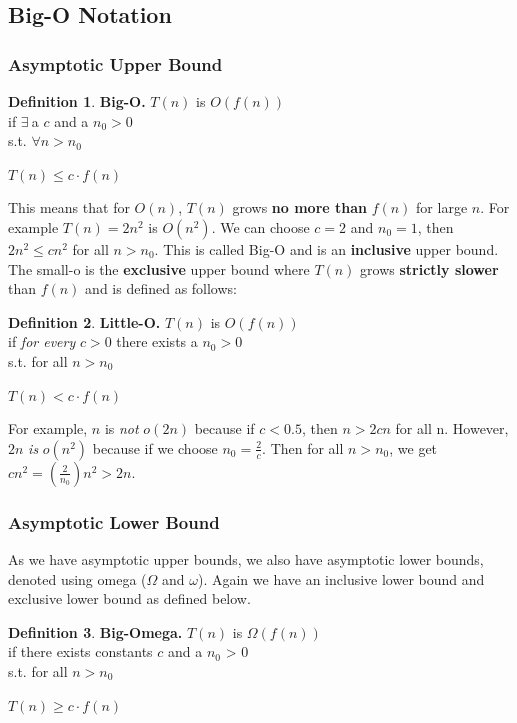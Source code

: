 \documentclass{article}
\theoremstyle{definition}
\newtheorem{definition}{Definition}[section]
\newcommand{\n}[0]{\\[\baselineskip]}
\begin{document}
\subsection{Big-O Notation}
\subsubsection{Asymptotic Upper Bound}
\begin{definition}{\textbf{Big-O.}}
$T(n)$ is $O(f(n))$ \\
if $\exists\ $a $c$ and a $n_{0} > 0$ \\
\quad s.t. $\forall n > n_{0}$
\begin{center}
$T(n) \leq c \cdot f(n)$
\end{center}
\end{definition}
\noindent
This means that for $O(n)$, $T(n)$ grows \textbf{no more than} $f(n)$ for large $n$. For example $T(n) = 2n^2$ is $O(n^2)$. We can choose $c = 2$ and $n_{0} = 1$, then $2n^2 \leq cn^2$ for all $n > n_{0}$. This is called Big-O and is an \textbf{inclusive} upper bound.
\n
The small-o is the \textbf{exclusive} upper bound where $T(n)$ grows \textbf{strictly slower} than $f(n)$ and is defined as follows:
\begin{definition}{\textbf{Little-O.}}
$T(n)$ is $O(f(n))$ \\
if \textit{for every} $c > 0$ there exists a $n_{0} > 0$ \\
s.t. for all $n > n_{0}$
\begin{center}
$T(n) < c \cdot f(n)$
\end{center}
\end{definition}
\noindent
For example, $n$ is \textit{not} $o(2n)$ because if $c < 0.5$, then $n > 2cn$ for all n. However, $2n$ \textit{is} $o(n^2)$ because if we choose $n_{0} = \frac{2}{c}$. Then for all $n > n_{0}$, we get $cn^2 = (\frac{2}{n_{0}})n^2 > 2n$.

\subsubsection{Asymptotic Lower Bound}
As we have asymptotic upper bounds, we also have asymptotic lower bounds, denoted using omega ($\Omega$ and $\omega$). Again we have an inclusive lower bound and exclusive lower bound as defined below.
\begin{definition}{\textbf{Big-Omega.}}
$T(n)$ is $\Omega(f(n))$ \\
if there exists constants $c$ and a $n_{0}$ > 0 \\
s.t. for all $n > n_{0}$
\begin{center}
$T(n) \geq c \cdot f(n)$
\end{center}
\end{definition}
\end{document}
